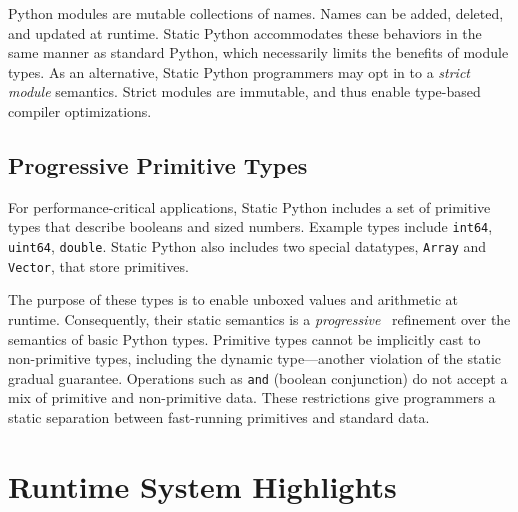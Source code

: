 \documentclass[english,cleveref,submission]{programming}
\newcommand{\SP}{Static Python}
\newcommand{\code}[1]{\texttt{#1}}
\begin{document}
Python modules are mutable collections of names.
Names can be added, deleted, and updated at runtime.
\SP{} accommodates these behaviors in the same manner as standard Python, which
necessarily limits the benefits of module types.
As an alternative, \SP{} programmers may opt in to a \emph{strict module} semantics.
Strict modules are immutable, and thus enable type-based compiler optimizations.


\subsection{Progressive Primitive Types}
\label{s:c-types}


For performance-critical applications, \SP{} includes a set of primitive types
that describe booleans and sized numbers.
Example types include \code{int64}, \code{uint64}, \code{double}.
\SP{} also includes two special datatypes, \code{Array} and \code{Vector}, that store primitives.

The purpose of these types is to enable unboxed values and arithmetic at
runtime.
Consequently, their static semantics is a \emph{progressive}~\cite{pqk-onward-2012}
refinement over the semantics of basic Python types.
Primitive types cannot be implicitly cast to non-primitive types,
including the dynamic type---another violation of the static gradual guarantee.
Operations such as \code{and} (boolean conjunction) do not accept a mix of primitive and non-primitive data.
These restrictions give programmers a static separation between fast-running
primitives and standard data.





\section{Runtime System Highlights}
\label{s:runtime}
\end{document}
